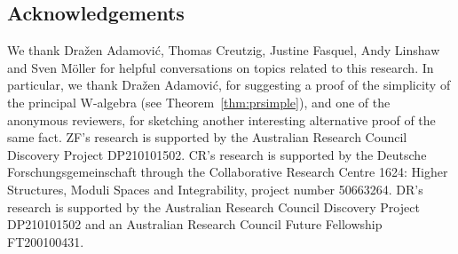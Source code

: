 \documentclass[pdftex]{sigma}
\numberwithin{equation}{section}
\begin{document}
\subsection*{Acknowledgements}

We thank Dra\v{z}en Adamovi\'{c}, Thomas Creutzig, Justine Fasquel, Andy Linshaw and Sven M{\"o}ller for helpful conversations on topics related to this research.
In particular, we thank Dra\v{z}en Adamovi\'{c}, for suggesting a proof of the simplicity of the principal W-algebra (see Theorem~\ref{thm:prsimple}), and one of the anonymous reviewers, for sketching another interesting alternative proof of the same fact.
ZF's research is supported by the Australian Research Council Discovery Project DP210101502.
CR's research is supported by the Deutsche Forschungsgemeinschaft through the Collaborative Research Centre 1624: Higher Structures, Moduli Spaces and Integrability, project number 50663264.
DR's research is supported by the Australian Research Council Discovery Project DP210101502 and an Australian Research Council Future Fellowship FT200100431.
\end{document}
